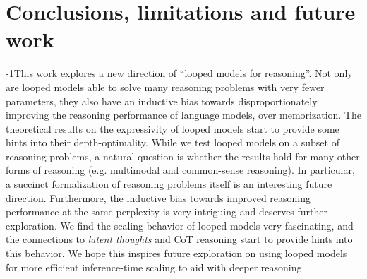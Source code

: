 \section{Conclusions, limitations and future work}
\vspace{-0.1in}

\looseness-1This work explores a new direction of ``looped models for reasoning''. Not only are looped models able to solve many reasoning problems with very fewer parameters, they also have an inductive bias towards disproportionately improving the reasoning performance of language models, over memorization. The theoretical results on the expressivity of looped models start to provide some hints into their depth-optimality.
While we test looped models on a subset of reasoning problems, a natural question is whether the results hold for many other forms of reasoning (e.g. multimodal and common-sense reasoning).
In particular, a succinct formalization of reasoning problems itself is an interesting future direction.
Furthermore, the inductive bias towards improved reasoning performance at the same perplexity is very intriguing and deserves further exploration.
We find the scaling behavior of looped models very fascinating, and the connections to {\em latent thoughts} and CoT reasoning start to provide hints into this behavior.
We hope this inspires future exploration on using looped models for more efficient inference-time scaling to aid with deeper reasoning.


